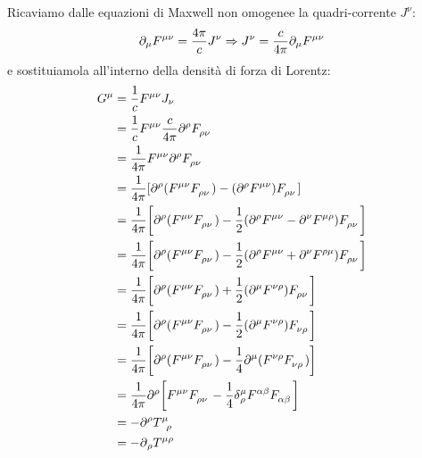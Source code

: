 \documentclass[twoside]{article}
\begin{document}
Ricaviamo dalle equazioni di Maxwell non omogenee la quadri-corrente $J^\nu$:
\begin{equation*}
\partial_\mu \tensor{F}{^\mu^\nu}=\frac{4\pi}{c}J^\nu \Rightarrow J^\nu=\frac{c}{4\pi} \partial_\mu \tensor{F}{^\mu^\nu}
\end{equation*}
e sostituiamola all'interno della densità di forza di Lorentz:
\begin{align*}
G^\mu&=\frac{1}{c}\tensor{F}{^\mu^\nu}J_\nu \\
&=\frac{1}{c}\tensor{F}{^\mu^\nu}\frac{c}{4\pi} \partial^\rho \tensor{F}{_\rho_\nu} \\
&=\frac{1}{4\pi}\tensor{F}{^\mu^\nu} \partial^\rho \tensor{F}{_\rho_\nu} \\
&=\frac{1}{4\pi}[\partial^\rho(\tensor{F}{^\mu^\nu}\tensor{F}{_\rho_\nu})-(\partial^\rho\tensor{F}{^\mu^\nu})\tensor{F}{_\rho_\nu}] \\
&=\frac{1}{4\pi} \biggl[ \partial^\rho(\tensor{F}{^\mu^\nu}\tensor{F}{_\rho_\nu})-\frac{1}{2}(\partial^\rho \tensor{F}{^\mu^\nu}-\partial^\nu \tensor{F}{^\mu^\rho})\tensor{F}{_\rho_\nu} \biggr] \\
&=\frac{1}{4\pi} \biggl[ \partial^\rho(\tensor{F}{^\mu^\nu}\tensor{F}{_\rho_\nu})-\frac{1}{2}(\partial^\rho \tensor{F}{^\mu^\nu}+\partial^\nu \tensor{F}{^\rho^\mu})\tensor{F}{_\rho_\nu} \biggr] \\
&=\frac{1}{4\pi} \biggl[ \partial^\rho(\tensor{F}{^\mu^\nu}\tensor{F}{_\rho_\nu})+\frac{1}{2}(\partial^\mu \tensor{F}{^\nu^\rho})\tensor{F}{_\rho_\nu} \biggr] \\
&=\frac{1}{4\pi} \biggl[ \partial^\rho(\tensor{F}{^\mu^\nu}\tensor{F}{_\rho_\nu})-\frac{1}{2}(\partial^\mu \tensor{F}{^\nu^\rho})\tensor{F}{_\nu_\rho} \biggr] \\
&=\frac{1}{4\pi} \biggl[ \partial^\rho(\tensor{F}{^\mu^\nu}\tensor{F}{_\rho_\nu})-\frac{1}{4}\partial^\mu(\tensor{F}{^\nu^\rho}\tensor{F}{_\nu_\rho}) \biggr] \\
&=\frac{1}{4\pi}\partial^\rho \biggl[ \tensor{F}{^\mu^\nu}\tensor{F}{_\rho_\nu}-\frac{1}{4}\delta{^\mu_\rho}\tensor{F}{^\alpha^\beta}\tensor{F}{_\alpha_\beta} \biggr] \\
&=-\partial{^\rho}\tensor{T}{^\mu_\rho} \\
&=-\partial{_\rho}\tensor{T}{^\mu^\rho}
\end{align*}
\end{document}
